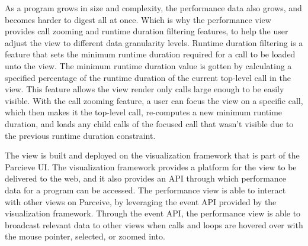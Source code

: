 As a program grows in size and complexity, the performance data also grows, and
becomes harder to digest all at once. Which is why the performance view
provides call zooming and runtime duration filtering features, to help the user
adjust the view to different data granularity levels. Runtime duration
filtering is a feature that sets the minimum runtime duration required for a
call to be loaded unto the view. The minimum runtime duration value is gotten
by calculating a specified percentage of the runtime duration of the current
top-level call in the view. This feature allows the view render only calls
large enough to be easily visible. With the call zooming feature, a user can
focus the view on a specific call, which then makes it the top-level call,
re-computes a new minimum runtime duration, and loads any child calls of the
focused call that wasn't visible due to the previous runtime duration
constraint.

The view is built and deployed on the visualization framework that is part of
the Parcieve UI. The visualization framework provides a platform for the view
to be delivered to the web, and it also provides an API through which
performance data for a program can be accessed. The performance view is able to
interact with other views on Parceive, by leveraging the event API provided by
the visualization framework. Through the event API, the performance view is
able to broadcast relevant data to other views when calls and loops are hovered
over with the mouse pointer, selected, or zoomed into.
